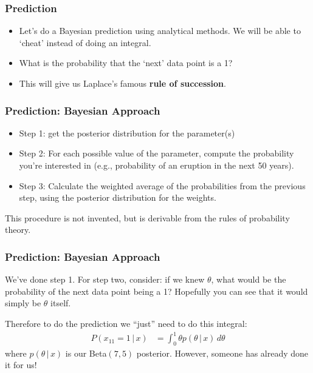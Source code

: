 \documentclass{beamer}
\newcommand{\given}{\,|\,}
\begin{document}
\begin{frame}
\frametitle{Prediction}

\begin{itemize}
\item Let's do a Bayesian prediction using analytical methods. We will be
able to `cheat' instead of doing an integral.\pause
\item What is the probability that the `next' data point is a 1?\pause
\item This will give us Laplace's famous {\bf rule of succession}.
\end{itemize}

\end{frame}

\begin{frame}
\frametitle{Prediction: Bayesian Approach}

\begin{itemize}
\item Step 1: get the posterior distribution for the parameter(s)\pause
\item Step 2: For each possible value of the parameter, compute the probability
you're interested in (e.g., probability of an eruption in the next 50
years).\pause
\item Step 3: Calculate the weighted average of the probabilities from the previous
step, using the posterior distribution for the weights.
\end{itemize}

This procedure is not invented, but is derivable from the rules of
probability theory.

\end{frame}

\begin{frame}
\frametitle{Prediction: Bayesian Approach}
We've done step 1. For step two, consider: if we knew $\theta$, what would
be the probability of the next data point being a 1? Hopefully you can see that
it would simply be $\theta$ itself.\pause

Therefore to do the prediction we ``just'' need to do this integral:
\begin{align}
P(x_{11} = 1 \given x) &= \int_0^1 \theta p(\theta \given x)\, d\theta
\end{align}
where $p(\theta \given x)$ is our Beta$(7, 5)$ posterior. However, someone
has already done it for us!

\end{frame}
\end{document}
